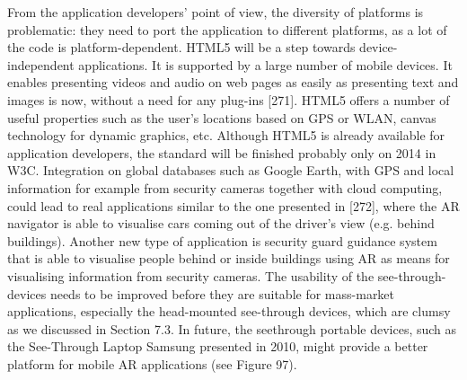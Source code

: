 From the application developers’ point of view, the diversity of platforms is problematic: they need to port the application to different platforms, as a lot of the code is platform-dependent. HTML5 will be a step towards device-independent applications. It is supported by a large number of mobile devices. It enables presenting videos and audio on web pages as easily as presenting text and images is now, without a need for any plug-ins [271]. HTML5 offers a number of useful properties such as the user’s locations based on GPS or WLAN, canvas technology for dynamic graphics, etc. Although HTML5 is already available for application developers, the standard will be finished probably only on 2014 in W3C. Integration on global databases such as Google Earth, with GPS and local information for example from security cameras together with cloud computing, could lead to real applications similar to the one presented in [272], where the AR navigator is able to visualise cars coming out of the driver’s view (e.g. behind buildings). Another new type of application is security guard guidance system that is able to visualise people behind or inside buildings using AR as means for visualising information from security cameras. The usability of the see-through-devices needs to be improved before they are suitable for mass-market applications, especially the head-mounted see-through devices, which are clumsy as we discussed in Section 7.3. In future, the seethrough portable devices, such as the See-Through Laptop Samsung presented in 2010, might provide a better platform for mobile AR applications (see Figure 97).


